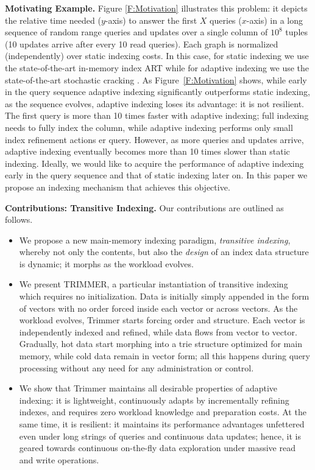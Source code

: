 \documentclass{sig-alternate}
\begin{document}
\textbf{Motivating Example.}
Figure \ref{F:Motivation} illustrates this problem: it depicts the relative time needed ($y$-axis) to answer the first $X$ queries ($x$-axis) in a long sequence of random range queries and updates over a single column of $10^8$ tuples (10 updates arrive after every 10 read queries). Each graph is normalized (independently) over static indexing costs. In this case, for static indexing we use the state-of-the-art in-memory index ART \cite{art} while for adaptive indexing we use the state-of-the-art stochastic cracking \cite{StochasticCracking}. As Figure~\ref{F:Motivation} shows, while early in the query sequence adaptive indexing significantly outperforms static indexing, as the sequence evolves, adaptive indexing loses its advantage: it is not resilient. The first query is more than 10 times faster with adaptive indexing; full indexing needs to fully index the column, while adaptive indexing performs only small index refinement actions er query. However, as more queries and updates arrive, adaptive indexing eventually becomes more than 10 times slower than static indexing. Ideally, we would like to acquire the performance of adaptive indexing early in the query sequence and that of static indexing later on. In this paper we propose an indexing mechanism that achieves this objective.

\textbf{Contributions: Transitive Indexing.}
Our contributions are outlined as follows.
\begin{itemize}
\item We propose a new main-memory indexing paradigm, {\em transitive indexing}, whereby not only the contents, but also the {\em design} of an index data structure is dynamic; it morphs as the workload evolves.
\item We present TRIMMER, a particular instantiation of transitive indexing which requires no initialization. Data is initially simply appended in the form of vectors with no order forced inside each vector or across vectors. As the workload evolves, Trimmer starts forcing order and structure. Each vector is independently indexed and refined, while data flows from vector to vector. Gradually, hot data start morphing into a trie structure optimized for main memory, while cold data remain in vector form; all this happens during query processing without any need for any administration or control.
\item We show that Trimmer maintains all desirable properties of adaptive indexing: it is lightweight, continuously adapts by incrementally refining indexes, and requires zero workload knowledge and preparation costs. At the same time, it is resilient: it maintains its performance advantages unfettered even under long strings of queries and continuous data updates; hence, it is geared towards continuous on-the-fly data exploration under massive read and write operations.
\end{itemize}
\end{document}

